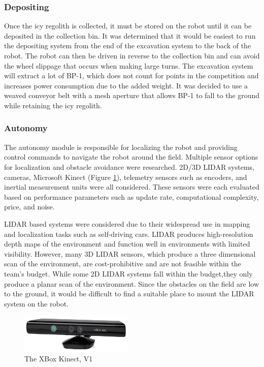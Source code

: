 \documentclass[class=article, crop=false]{standalone}
\begin{document}
	
	\subsubsection{Depositing}
	Once the icy regolith is collected, it must be stored on the robot until it can be deposited in the collection bin. It was determined that it would be easiest to run the depositing system from the end of the excavation system to the back of the robot. The robot can then be driven in reverse to the collection bin and can avoid the wheel slippage that occurs when making large turns. The excavation system will extract a lot of BP-1, which does not count for points in the competition and increases power consumption due to the added weight. It was decided to use a weaved conveyor belt with a mesh aperture that allows BP-1 to fall to the ground while retaining the icy regolith.
	
	
	\subsubsection{Autonomy}
	The autonomy module is responsible for localizing the robot and providing control commands to navigate the robot around the field. Multiple sensor options for localization and obstacle avoidance were researched. 2D/3D LIDAR systems, cameras, Microsoft Kinect (Figure \ref{fig:kinect-pic}), telemetry sensors such as encoders, and inertial measurement units were all considered. These sensors were each evaluated based on performance parameters such as update rate, computational complexity, price, and noise.
	
	LIDAR based systems were considered due to their widespread use in mapping and localization tasks such as self-driving cars. LIDAR produces high-resolution depth maps of the environment and function  well in environments with limited visibility. However, many 3D LIDAR sensors, which produce a three dimensional scan of the environment, are cost-prohibitive and are not feasible within the team’s budget. While some 2D LIDAR systems fall within the budget,they only produce a planar scan of the environment. Since the obstacles on the field are low to the ground, it would be difficult to find a suitable place to mount the LIDAR system on the robot. 
	
	\begin{figure}
	\centering
	 \includegraphics[width=0.48\textwidth]{09_Figures/xbox-360-kinect.png}
	 \caption{The XBox Kinect, V1}
	 \label{fig:kinect-pic}
	\end{figure}
	
\end{document}
